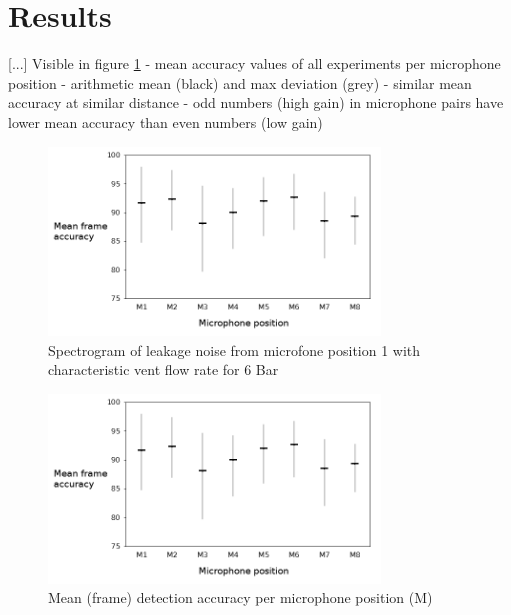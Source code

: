 \documentclass[a4paper,12pt]{article}
\begin{document}
\section{Results}

[...]
Visible in figure \ref{fig:meanfracc} 
- mean accuracy values of all experiments per microphone position
- arithmetic mean (black) and max deviation (grey)
- similar mean accuracy at similar distance 
- odd numbers (high gain) in microphone pairs have lower mean accuracy than even numbers (low gain)

\begin{figure}[h]
	\centering
	\includegraphics[width=88mm]{images/mean_frame_acc.png}
	\caption{Spectrogram of leakage noise from microfone position 1 with characteristic vent flow rate for 6 Bar}
	\label{fig:meanfracc}
\end{figure}

\iffalse


\begin{figure}[h]
	\centering
	\includegraphics[width=88mm]{images/mean_frame_acc.png}
	\caption{Mean (frame) detection accuracy per microphone position (M)}
	\label{fig:mean_frame_acc}
\end{figure}
\end{document}
